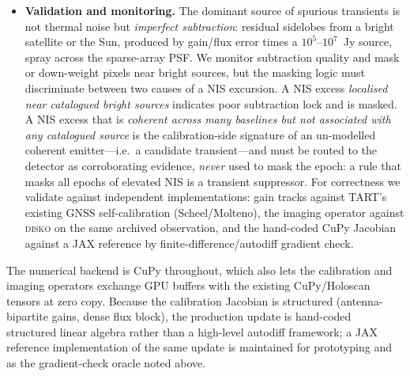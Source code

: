 \documentclass[11pt]{article}
\begin{document}
\begin{itemize}[leftmargin=*]
        no downstream stage may assume a constant $\Delta$ (Section~\ref{sec:statespace}).
  \item \textbf{Validation and monitoring.} The dominant source of spurious transients is not thermal
        noise but \emph{imperfect subtraction}: residual sidelobes from a bright satellite or the Sun,
        produced by gain/flux error times a $10^5$--$10^7$~Jy source, spray across the sparse-array
        PSF. We monitor subtraction quality and mask or down-weight pixels near bright sources, but
        the masking logic must discriminate between two causes of a NIS excursion. A NIS excess
        \emph{localised near catalogued bright sources} indicates poor subtraction lock and is
        masked. A NIS excess that is \emph{coherent across many baselines but not associated with
        any catalogued source} is the calibration-side signature of an un-modelled coherent
        emitter---i.e.\ a candidate transient---and must be routed to the detector as corroborating
        evidence, \emph{never} used to mask the epoch: a rule that masks all epochs of elevated NIS
        is a transient suppressor. For
        correctness we validate against independent implementations: gain tracks against TART's
        existing GNSS self-calibration (Scheel/Molteno), the imaging operator against \textsc{disko}
        on the same archived observation, and the hand-coded CuPy Jacobian against a JAX reference by
        finite-difference/autodiff gradient check.
\end{itemize}
The numerical backend is CuPy throughout, which also lets the calibration and imaging operators
exchange GPU buffers with the existing CuPy/Holoscan tensors at zero copy. Because the calibration
Jacobian is structured (antenna-bipartite gains, dense flux block), the production update is hand-coded
structured linear algebra rather than a high-level autodiff framework; a JAX reference implementation
of the same update is maintained for prototyping and as the gradient-check oracle noted above.
\end{document}
